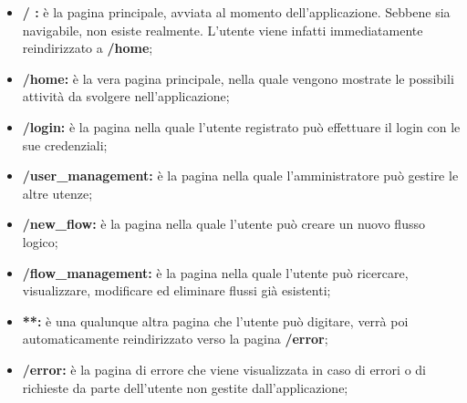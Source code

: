 \begin{itemize}
    \item \textbf{/ :} è la pagina principale, avviata al momento dell’applicazione. Sebbene
sia navigabile, non esiste realmente. L’utente viene infatti immediatamente
reindirizzato a \textbf{/home};
    \item \textbf{/home:} è la vera pagina principale, nella quale vengono mostrate le possibili attività da svolgere nell'applicazione; 
    \item \textbf{/login:} è la pagina nella quale l'utente registrato può effettuare il login con le sue credenziali;
    \item \textbf{/user\_management:} è la pagina nella quale l'amministratore può gestire le altre utenze;
    \item \textbf{/new\_flow:} è la pagina nella quale l'utente può creare un nuovo flusso logico;
    \item \textbf{/flow\_management:} è la pagina nella quale l'utente può ricercare, visualizzare, modificare ed eliminare flussi già esistenti;
    \item \textbf{**:} è una qualunque altra pagina che l'utente può digitare, verrà poi automaticamente reindirizzato verso la pagina \textbf{/error};
    \item \textbf{/error:} è la pagina di errore che viene visualizzata in caso di errori o di richieste da parte dell'utente non gestite dall'applicazione;
\end{itemize}


